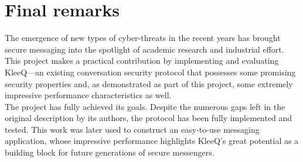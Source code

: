 \documentclass[a4paper, twoside, 12pt]{report}
\newcommand{\skippage}{\cleardoublepage}
\begin{document}
\section{Final remarks}
The emergence of new types of cyber-threats in the recent years has brought secure messaging into the spotlight of academic research and industrial effort. This project makes a practical contribution by implementing and evaluating KleeQ---an existing conversation security protocol that possesses some promising security properties and, as demonstrated as part of this project, some extremely impressive performance characteristics as well.  \\

The project has fully achieved its goals. Despite the numerous gaps left in the original description by its authors, the protocol has been fully implemented and tested. This work was later used to construct an easy-to-use messaging application, whose impressive performance highlights KleeQ's great potential as a building block for future generations of secure messengers.






\skippage
\end{document}
